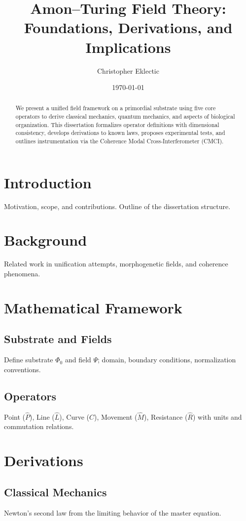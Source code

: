 \documentclass[12pt]{article}
\title{Amon--Turing Field Theory: Foundations, Derivations, and Implications}
\author{Christopher Eklectic}
\date{\today}
\begin{document}
\maketitle
\begin{abstract}
We present a unified field framework on a primordial substrate using five core operators to derive classical mechanics, quantum mechanics, and aspects of biological organization. This dissertation formalizes operator definitions with dimensional consistency, develops derivations to known laws, proposes experimental tests, and outlines instrumentation via the Coherence Modal Cross-Interferometer (CMCI).
\end{abstract}

\tableofcontents
\listoffigures
\listoftables

\section{Introduction}
Motivation, scope, and contributions. Outline of the dissertation structure.

\section{Background}
Related work in unification attempts, morphogenetic fields, and coherence phenomena.

\section{Mathematical Framework}
\subsection{Substrate and Fields}
Define substrate $\Phi_0$ and field $\Psi$; domain, boundary conditions, normalization conventions.
\subsection{Operators}
Point ($\hat P$), Line ($\hat L$), Curve ($\hat C$), Movement ($\hat M$), Resistance ($\hat R$) with units and commutation relations.

\section{Derivations}
\subsection{Classical Mechanics}
Newton's second law from the limiting behavior of the master equation.
\end{document}
